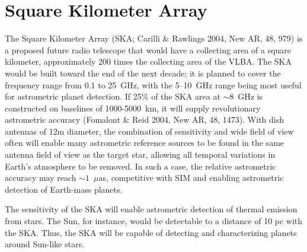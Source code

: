 \documentclass[12pt,preprint]{aastex}
\begin{document}
\section{Square Kilometer Array} 

The Square Kilometer Array (SKA; Carilli \& Rawlings 2004, New AR, 48,
979) is a proposed future radio telescope
that would have a collecting area of a square kilometer, approximately
200 times the collecting area of the VLBA.  The SKA would be built
toward the end of the next decade; it is planned to cover the
frequency range from 0.1 to 25~GHz, with the 5--10~GHz range being
most useful for astrometric planet detection.  If 25\% of the SKA area
at $\sim 8$~GHz is constructed on baselines of 1000-5000~km, it will
supply revolutionary astrometric accuracy (Fomalont \& Reid 2004, New
AR, 48, 1473).  With dish antennas of 12m diameter, the combination of
sensitivity and wide field of view often will enable many astrometric
reference sources to be found in the same antenna field of view as the
target star, allowing all temporal variations in Earth's atmosphere to
be removed.  In such a case, the relative astrometric accuracy may
reach $\sim 1$~$\mu$as, competitive with SIM and enabling astrometric
detection of Earth-mass planets.

The sensitivity of the SKA will enable astrometric detection of 
thermal emission from stars.  
The Sun, for instance, would be detectable to a distance of 10 pc with
the SKA.  Thus, the SKA will be capable of detecting and characterizing
planets around Sun-like stars.
\end{document}
